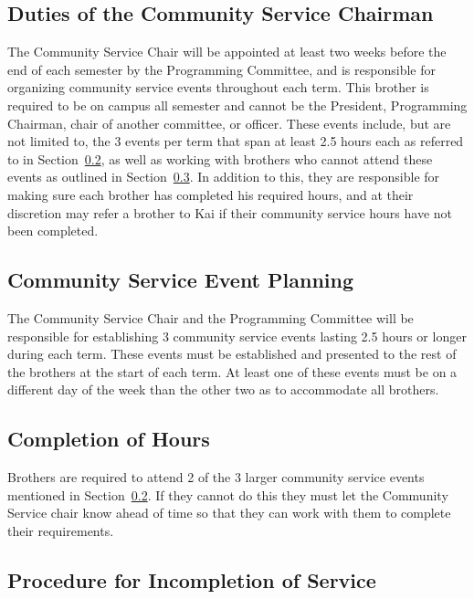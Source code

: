 \subsection{Duties of the Community Service Chairman}
\label{sec:duties-of-the-community-service-chairman}

The Community Service Chair will be appointed at least two weeks before the end
of each semester by the Programming Committee, and is responsible for organizing
community service events throughout each term.
This brother is required to be on campus all semester and cannot be the
President, Programming Chairman, chair of another committee, or officer.
These events include, but are not limited to, the 3 events per term that span at
least 2.5 hours each as referred to in
Section~\ref{sec:community-service-event-planning}, as well as working with
brothers who cannot attend these events as outlined in
Section~\ref{sec:completion-of-hours}.
In addition to this, they are responsible for making sure each brother has
completed his required hours, and at their discretion may refer a brother to Kai
if their community service hours have not been completed.

\subsection{Community Service Event Planning}
\label{sec:community-service-event-planning}

The Community Service Chair and the Programming Committee will be responsible
for establishing 3 community service events lasting 2.5 hours or longer during
each term.
These events must be established and presented to the rest of the brothers at
the start of each term.
At least one of these events must be on a different day of the week than the
other two as to accommodate all brothers.

\subsection{Completion of Hours}
\label{sec:completion-of-hours}

Brothers are required to attend 2 of the 3 larger community service events
mentioned in Section~\ref{sec:community-service-event-planning}.
If they cannot do this they must let the Community Service chair know ahead of
time so that they can work with them to complete their requirements.

\subsection{Procedure for Incompletion of Service}
\label{sec:procedure-for-incompletion-of-service}

